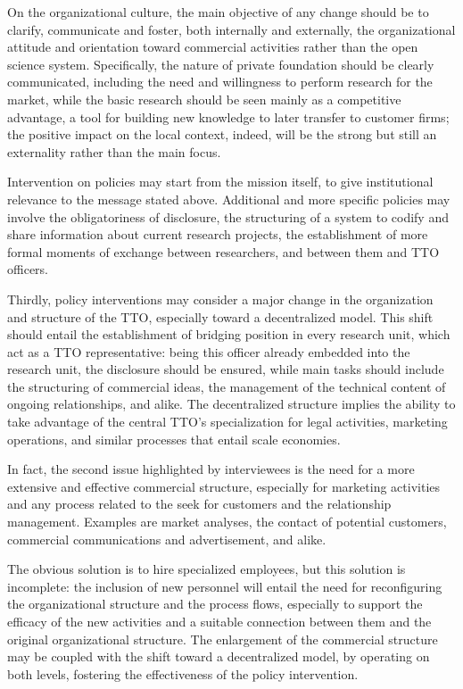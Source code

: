 On the organizational culture, the main objective of any change should be to clarify, communicate and foster, both internally and externally, the organizational attitude and orientation toward commercial activities rather than the open science system. Specifically, the nature of private foundation should be clearly communicated, including the need and willingness to perform research for the market, while the basic research should be seen mainly as a competitive advantage, a tool for building new knowledge to later transfer to customer firms; the positive impact on the local context, indeed, will be the strong but still an externality rather than the main focus. 

Intervention on policies may start from the mission itself, to give institutional relevance to the message stated above. Additional and more specific policies may involve the obligatoriness of disclosure, the structuring of a system to codify and share information about current research projects, the establishment of more formal moments of exchange between researchers, and between them and TTO officers.

Thirdly, policy interventions may consider a major change in the organization and structure of the TTO, especially toward a decentralized model. This shift should entail the establishment of bridging position in every research unit, which act as a TTO representative: being this officer already embedded into the research unit, the disclosure should be ensured, while main tasks should include the structuring of commercial ideas, the management of the technical content of ongoing relationships, and alike. The decentralized structure implies the ability to take advantage of the central TTO's specialization for legal activities, marketing operations, and similar processes that entail scale economies.

In fact, the second issue highlighted by interviewees is the need for a more extensive and effective commercial structure, especially for marketing activities and any process related to the seek for customers and the relationship management. Examples are market analyses, the contact of potential customers, commercial communications and advertisement, and alike. 

The obvious solution is to hire specialized employees, but this solution is incomplete: the inclusion of new personnel will entail the need for reconfiguring the organizational structure and the process flows, especially to support the efficacy of the new activities and a suitable connection between them and the original organizational structure. The enlargement of the commercial structure may be coupled with the shift toward a decentralized model, by operating on both levels, fostering the effectiveness of the policy intervention.

